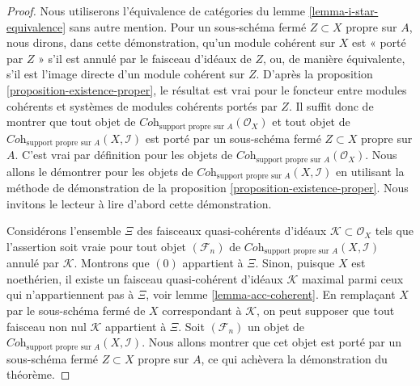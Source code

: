\begin{proof}
Nous utiliserons l'équivalence de catégories du
lemme \ref{lemma-i-star-equivalence}
sans autre mention.
Pour un sous-schéma fermé $Z \subset X$ propre sur $A$,
nous dirons, dans cette démonstration, qu'un module cohérent sur $X$ est
« porté par $Z$ » s'il est annulé par le faisceau
d'idéaux de $Z$, ou, de manière équivalente, s'il est l'image
directe d'un module cohérent sur $Z$.
D'après la proposition \ref{proposition-existence-proper}, le
résultat est vrai pour le
foncteur entre modules cohérents et systèmes de modules
cohérents portés par $Z$. Il suffit donc de montrer que
tout objet de
$\textit{Coh}_{\text{support propre sur }A}(\mathcal{O}_X)$
et tout objet de
$\textit{Coh}_{\text{support propre sur }A}(X, \mathcal{I})$ est
porté par un sous-schéma fermé $Z \subset X$ propre sur $A$.
C'est vrai par définition pour les objets de
$\textit{Coh}_{\text{support propre sur }A}(\mathcal{O}_X)$.
Nous allons le démontrer pour les objets de
$\textit{Coh}_{\text{support propre sur }A}(X, \mathcal{I})$
en utilisant la méthode de démonstration de la proposition \ref{proposition-existence-proper}.
Nous invitons le lecteur à lire d'abord cette démonstration.

\medskip\noindent
Considérons l'ensemble $\Xi$ des faisceaux quasi-cohérents d'idéaux
$\mathcal{K} \subset \mathcal{O}_X$ tels que l'assertion soit vraie
pour tout objet $(\mathcal{F}_n)$ de
$\textit{Coh}_{\text{support propre sur }A}(X, \mathcal{I})$
annulé par $\mathcal{K}$. Montrons que $(0)$ appartient à $\Xi$.
Sinon, puisque $X$ est noethérien, il existe un
faisceau quasi-cohérent d'idéaux $\mathcal{K}$ maximal parmi ceux qui n'appartiennent pas à $\Xi$, voir
lemme \ref{lemma-acc-coherent}.
En remplaçant $X$ par le sous-schéma fermé de $X$
correspondant à $\mathcal{K}$, on peut supposer que tout faisceau non nul
$\mathcal{K}$ appartient à $\Xi$. Soit $(\mathcal{F}_n)$ un objet de
$\textit{Coh}_{\text{support propre sur }A}(X, \mathcal{I})$.
Nous allons montrer que cet objet est porté par un sous-schéma fermé
$Z \subset X$ propre sur $A$, ce qui achèvera
la démonstration du théorème.


\end{proof}
